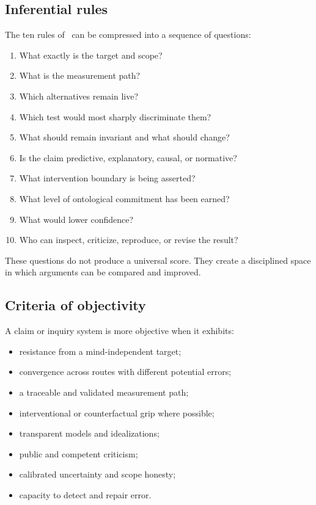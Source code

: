 \subsection{Inferential rules}

The ten rules of \RCR\ can be compressed into a sequence of questions:

\begin{enumerate}
\item What exactly is the target and scope?
\item What is the measurement path?
\item Which alternatives remain live?
\item Which test would most sharply discriminate them?
\item What should remain invariant and what should change?
\item Is the claim predictive, explanatory, causal, or normative?
\item What intervention boundary is being asserted?
\item What level of ontological commitment has been earned?
\item What would lower confidence?
\item Who can inspect, criticize, reproduce, or revise the result?
\end{enumerate}

These questions do not produce a universal score. They create a disciplined
space in which arguments can be compared and improved.

\subsection{Criteria of objectivity}

A claim or inquiry system is more objective when it exhibits:

\begin{itemize}
\item resistance from a mind-independent target;
\item convergence across routes with different potential errors;
\item a traceable and validated measurement path;
\item interventional or counterfactual grip where possible;
\item transparent models and idealizations;
\item public and competent criticism;
\item calibrated uncertainty and scope honesty;
\item capacity to detect and repair error.
\end{itemize}

